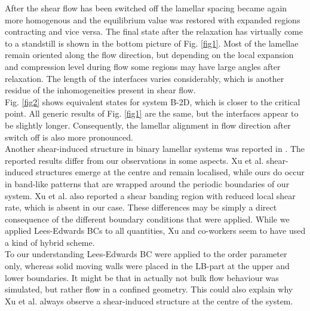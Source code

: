\documentclass[8.5pt,twoside,twocolumn]{article}
\begin{document}
After the shear flow has been switched off the lamellar spacing became again more homogenous and the equilibrium value was restored with expanded regions contracting and vice versa.
The final state after the relaxation has virtually come to a standstill is shown in the bottom picture of Fig. \ref{fig1}. 
Most of the lamellae remain oriented along the flow direction, but depending on the local expansion and compression level during flow some regions may have large angles after relaxation. 
The length of the interfaces varies considerably, which is another residue of the inhomogeneities present in shear flow.\\
Fig. \ref{fig2} shows equivalent states for system B-2D, which is closer to the critical point.
All generic results of Fig. \ref{fig1} are the same, but the interfaces appear to be slightly longer.
Consequently, the lamellar alignment in flow direction after switch off is also more pronounced.\\ 
Another shear-induced structure in binary lamellar systems was reported in \cite{Xu06b}.
The reported results differ from our observations in some aspects.
Xu et al. shear-induced structures emerge at the centre and remain localised, while ours do occur in band-like patterns that are wrapped around the periodic boundaries of our system.
Xu et al. also reported a shear banding region with reduced local shear rate, which is absent in our case.
These differences may be simply a direct consequence of the different boundary conditions that were applied.
While we applied Lees-Edwards BCs to all quantities, Xu and co-workers seem to have used a kind of hybrid scheme.\\
To our understanding Lees-Edwards BC were applied to the order parameter only, whereas solid moving walls were placed in the LB-part at the upper and lower boundaries.
It might be that in \cite{Xu06b} actually not bulk flow behaviour was simulated, but rather flow in a confined geometry. 
This could also explain why Xu et al. always observe a shear-induced structure at the centre of the system.\\ 
\end{document}
